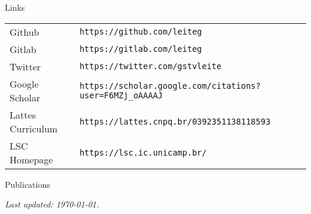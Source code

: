 \documentclass{resume}
\begin{document}
\begin{rSection}{Links}
  \begin{tabular}{ll}
    Github            & {\tt https://github.com/leiteg} \\
    Gitlab            & {\tt https://gitlab.com/leiteg} \\
    Twitter           & {\tt https://twitter.com/gstvleite} \\
    Google Scholar    & {\tt https://scholar.google.com/citations?user=F6MZj\_oAAAAJ} \\
    Lattes Curriculum & {\tt https://lattes.cnpq.br/0392351138118593} \\
    LSC Homepage      & {\tt https://lsc.ic.unicamp.br/}
  \end{tabular}
\end{rSection}

\begin{rSection}{Publications}

\renewcommand{\section}[2]{}

\end{rSection}

\vfill \hfill {\em Last updated: \today.}
\end{document}
